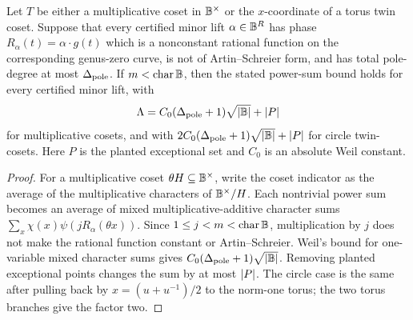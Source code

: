 \documentclass[11pt,a4paper]{amsart}
\numberwithin{equation}{section}
\theoremstyle{remark}
\begin{document}
\begin{proposition}\label{prop:weighted-weil-minor-arcs}
Let \(T\) be either a multiplicative coset in \(\mathbb B^\times\) or the \(x\)-coordinate of a torus twin coset.  Suppose that every certified minor lift \(\alpha\in\mathbb B^R\) has phase \(R_\alpha(t)=\alpha\cdot g(t)\) which is a nonconstant rational function on the corresponding genus-zero curve, is not of Artin--Schreier form, and has total pole-degree at most \(\Delta_{\rm pole}\).  If \(m<\operatorname{char}\mathbb B\), then the stated power-sum bound holds for every certified minor lift, with
\[
        \Lambda=C_0(\Delta_{\rm pole}+1)\sqrt{\lvert \mathbb B\rvert}+\lvert P\rvert
\]
for multiplicative cosets, and with \(2C_0(\Delta_{\rm pole}+1)\sqrt{\lvert \mathbb B\rvert}+\lvert P\rvert\) for circle twin-cosets.  Here \(P\) is the planted exceptional set and \(C_0\) is an absolute Weil constant.
\end{proposition}

\begin{proof}
For a multiplicative coset \(\theta H\subseteq\mathbb B^\times\), write the coset indicator as the average of the multiplicative characters of \(\mathbb B^\times/H\).  Each nontrivial power sum becomes an average of mixed multiplicative-additive character sums \(\sum_x\chi(x)\psi(jR_\alpha(\theta x))\).  Since \(1\le j<m<\operatorname{char}\mathbb B\), multiplication by \(j\) does not make the rational function constant or Artin--Schreier.  Weil's bound for one-variable mixed character sums \cite{Weil} gives \(C_0(\Delta_{\rm pole}+1)\sqrt{\lvert \mathbb B\rvert}\).  Removing planted exceptional points changes the sum by at most \(\lvert P\rvert\).  The circle case is the same after pulling back by \(x=(u+u^{-1})/2\) to the norm-one torus; the two torus branches give the factor two.
\end{proof}
\end{document}
